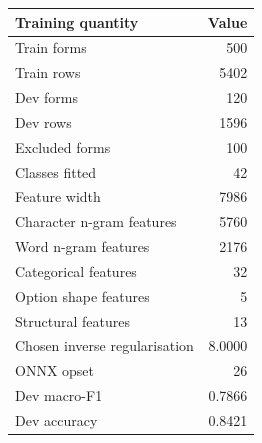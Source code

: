 \begingroup\small\setlength{\tabcolsep}{4pt}
\begin{tabular}{lr}
\toprule
\textbf{Training quantity} & \textbf{Value} \\
\midrule
Train forms & 500 \\  %
Train rows & 5402 \\  %
Dev forms & 120 \\  %
Dev rows & 1596 \\  %
Excluded forms & 100 \\  %
Classes fitted & 42 \\  %
Feature width & 7986 \\  %
Character n-gram features & 5760 \\  %
Word n-gram features & 2176 \\  %
Categorical features & 32 \\  %
Option shape features & 5 \\  %
Structural features & 13 \\  %
Chosen inverse regularisation & 8.0000 \\  %
ONNX opset & 26 \\  %
Dev macro-F1 & 0.7866 \\  %
Dev accuracy & 0.8421 \\  %
\bottomrule
\end{tabular}
\endgroup
\par\smallskip{}
\par{}
